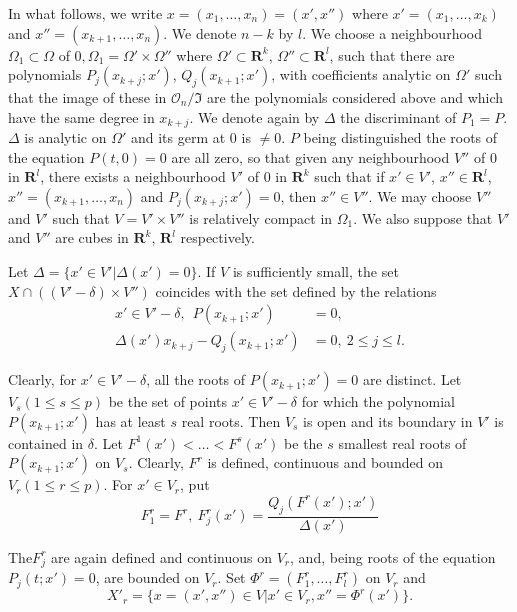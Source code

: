 In what follows, we write  $x = (x_1, \ldots, x_n) = (x', x'')$ where $x' = (x_1, \ldots, x_k)$ and $x'' = (x_{k+1}, \ldots, x_n)$. We denote $n-k$ by $l$. We choose a neighbourhood $\Omega_1 \subset \Omega$ of $0, \Omega_1 = \Omega' \times \Omega''$ where $\Omega' \subset \mathbf{R}^k$, $\Omega'' \subset \mathbf{R}^l$, such that there are polynomials $P_j (x_{k+j}; x')$, $Q_j (x_{k+1} ; x')$, with coefficients analytic on $\Omega'$ such that the image of these in $\mathcal{O}_n/\mathfrak{I}$ are the polynomials considered above and which have the same degree in $x_{k+j}$. We denote again by $\Delta $ the discriminant of $P_1 =P$. $\Delta$ is analytic on $\Omega'$ and its germ at $0$ is $\neq 0$. $P$ being distinguished the roots of the equation $P(t,0) =0$  are all zero, so that given any neighbourhood $V''$ of $0$ in $\mathbf{R}^l$, there exists a neighbourhood $V'$ of 0 in $\mathbf{R}^k$ such that if $x'\in V'$, $x'' \in \mathbf{R}^l$, $x'' = (x_{k+1}, \ldots, x_n)$ and $P_j(x_{k+j} ; x')=0$, then $x'' \in V''$. We may choose $V''$ and $V'$ such that $V = V' \times V''$ is relatively compact in $\Omega_1$. We also suppose that $V'$  and $V''$ are cubes in $\mathbf{R}^k$, $\mathbf{R}^l$ respectively. 

Let $\Delta = \{x' \in V' |\Delta (x') = 0\}$. If $V$ is sufficiently small, the set $X \cap ((V' - \delta) \times V'')$ coincides with the set defined by the relations
\begin{align*}
 x' \in V' - \delta , ~~ P(x_{k+1} ; x') & = 0,\\
 \Delta (x')x_{k+j} - Q_j(x_{k+1} ; x') & = 0, ~ 2 \leq j \leq l.
\end{align*}

Clearly, for $x' \in V' -\delta$, all the roots of $P(x_{k+1}; x') =0$ are distinct. Let $V_s (1 \leq s \leq p)$ be the set of points $x' \in V' - \delta$ for which the polynomial $P(x_{k+1}; x')$ has at least $s$ real roots. Then $V_s$ is open and its boundary in $V'$ is contained in $\delta$. Let $F^1(x')< \ldots < F^s (x')$ be the $s$ smallest real roots of $P(x_{k+1} ; x')$ on $V_s$. Clearly, $F^r$ is defined, continuous and bounded on $V_r (1 \leq r \leq p)$. For $x' \in V_r$, put
$$
F^r_1 = F^r, ~ F^r_j (x') = \frac{Q_j (F^r (x') ; x')}{\Delta (x')}
$$

The\pageoriginale $F^r_j$ are again defined and continuous on $V_r$, and, being roots of the equation $P_j (t;x') =0$, are bounded on $V_r$. Set $\Phi^r = (F^r_1, \ldots, F^r_l)$ on $V_r$ and
$$
X'_r = \{x = (x', x'') \in V | x' \in V_r, x'' = \Phi^r (x')\}.
$$

